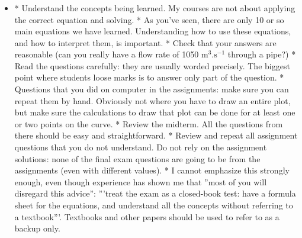 \begin{frame}\frametitle{}
	\begin{itemize}
		\item	
		* Understand the concepts being learned. My courses are not about applying the correct equation and solving.
		* As you've seen, there are only 10 or so main equations we have learned. Understanding how to use these equations, and how to interpret them, is important.
		* Check that your answers are reasonable (can you really have a flow rate of 1050 \(\text{m}^3.\text{s}^{-1}\) through a pipe?)
		* Read the questions carefully: they are usually worded precisely. The biggest point where students loose marks is to answer only part of the question.
		* Questions that you did on computer in the assignments: make sure you can repeat them by hand. Obviously not where you have to draw an entire plot, but make sure the calculations to draw that plot can be done for at least one or two points on the curve.
		* Review the midterm. All the questions from there should be easy and straightforward.
		* Review and repeat all assignment questions that you do not understand. Do not rely on the assignment solutions: none of the final exam questions are going to be from the assignments (even with different values).
		* I cannot emphasize this strongly enough, even though experience has shown me that ''most of you will disregard this advice'': '''treat the exam as a closed-book test: have a formula sheet for the equations, and understand all the concepts without referring to a textbook'''.  Textbooks and other papers should be used to refer to as a backup only.

	\end{itemize}
\end{frame}